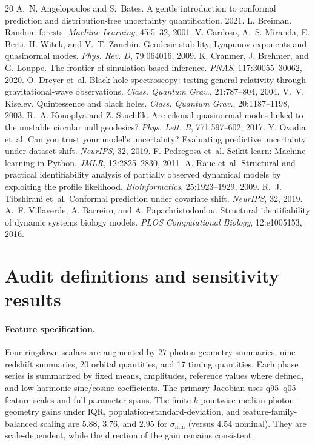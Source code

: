 \documentclass{article}
\newcommand{\smin}{\sigma_{\min}}
\begin{document}
\begin{thebibliography}{20}\setlength{\itemsep}{0pt}
 A.~N. Angelopoulos and S.~Bates. A gentle introduction to conformal prediction and distribution-free uncertainty quantification. 2021.
 L. Breiman. Random forests. \emph{Machine Learning}, 45:5--32, 2001.
 V. Cardoso, A.~S. Miranda, E. Berti, H. Witek, and V.~T. Zanchin. Geodesic stability, Lyapunov exponents and quasinormal modes. \emph{Phys. Rev. D}, 79:064016, 2009.
 K. Cranmer, J. Brehmer, and G. Louppe. The frontier of simulation-based inference. \emph{PNAS}, 117:30055--30062, 2020.
 O. Dreyer et~al. Black-hole spectroscopy: testing general relativity through gravitational-wave observations. \emph{Class. Quantum Grav.}, 21:787--804, 2004.
 V.~V. Kiselev. Quintessence and black holes. \emph{Class. Quantum Grav.}, 20:1187--1198, 2003.
 R.~A. Konoplya and Z. Stuchl\'{\i}k. Are eikonal quasinormal modes linked to the unstable circular null geodesics? \emph{Phys. Lett. B}, 771:597--602, 2017.
 Y. Ovadia et~al. Can you trust your model's uncertainty? Evaluating predictive uncertainty under dataset shift. \emph{NeurIPS}, 32, 2019.
 F. Pedregosa et~al. Scikit-learn: Machine learning in Python. \emph{JMLR}, 12:2825--2830, 2011.
 A. Raue et~al. Structural and practical identifiability analysis of partially observed dynamical models by exploiting the profile likelihood. \emph{Bioinformatics}, 25:1923--1929, 2009.
 R.~J. Tibshirani et~al. Conformal prediction under covariate shift. \emph{NeurIPS}, 32, 2019.
 A.~F. Villaverde, A. Barreiro, and A. Papachristodoulou. Structural identifiability of dynamic systems biology models. \emph{PLOS Computational Biology}, 12:e1005153, 2016.
\end{thebibliography}
\appendix
\section{Audit definitions and sensitivity results}\label{app:extra}
\paragraph{Feature specification.} Four ringdown scalars are augmented by 27 photon-geometry summaries, nine redshift summaries, 20 orbital quantities, and 17 timing quantities. Each phase series is summarized by fixed means, amplitudes, reference values where defined, and low-harmonic sine/cosine coefficients. The primary Jacobian uses q95--q05 feature scales and full parameter spans. The finite-$k$ pointwise median photon-geometry gains under IQR, population-standard-deviation, and feature-family-balanced scaling are $5.88$, $3.76$, and $2.95$ for $\smin$ (versus $4.54$ nominal). They are scale-dependent, while the direction of the gain remains consistent.
\end{document}
